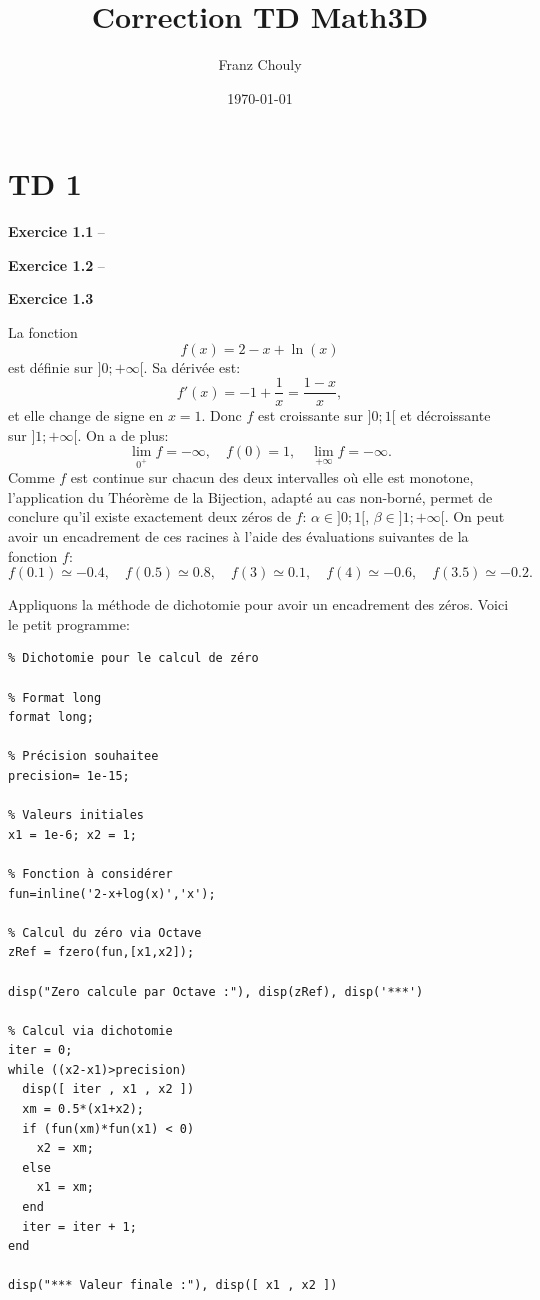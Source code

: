 \documentclass{article}
\title{Correction TD Math3D}
\author{Franz Chouly}
\date{\today}
\begin{document}
\maketitle

\section{TD 1}

{\bf Exercice 1.1} --

{\bf Exercice 1.2} --

{\bf Exercice 1.3}

La fonction
$$ f(x) = 2 - x + \ln(x) $$
est définie sur $]0;+\infty[$. Sa dérivée est:
$$ f'(x) = -1 + \frac{1}{x} = \frac{1-x}{x},$$
et elle change de signe en $x=1$. Donc $f$ est croissante sur $]0;1[$ et décroissante sur $]1;+\infty[$. On a de plus:
$$ \lim_{0^+} f = -\infty, \quad f(0) = 1, \quad \lim_{+\infty} f = -\infty.$$
Comme $f$ est continue sur chacun des deux intervalles où elle est monotone, l'application du Théorème de la Bijection, adapté au cas non-borné, permet de conclure qu'il existe exactement deux zéros de $f$: $\alpha \in ]0;1[$, $\beta \in ]1;+\infty[$.
On peut avoir un encadrement de ces racines à l'aide des évaluations suivantes de la fonction $f$:
$$
f(0.1) \simeq -0.4, \quad f(0.5) \simeq 0.8, \quad f(3) \simeq 0.1, \quad f(4) \simeq -0.6, \quad f(3.5) \simeq -0.2.
$$

\newpage

Appliquons la méthode de dichotomie pour avoir un encadrement des zéros. Voici le petit programme:
{\scriptsize
\begin{verbatim}
% Dichotomie pour le calcul de zéro

% Format long
format long;

% Précision souhaitee
precision= 1e-15;

% Valeurs initiales
x1 = 1e-6; x2 = 1;

% Fonction à considérer
fun=inline('2-x+log(x)','x');

% Calcul du zéro via Octave
zRef = fzero(fun,[x1,x2]);

disp("Zero calcule par Octave :"), disp(zRef), disp('***')

% Calcul via dichotomie
iter = 0;
while ((x2-x1)>precision)
  disp([ iter , x1 , x2 ])
  xm = 0.5*(x1+x2);
  if (fun(xm)*fun(x1) < 0)
    x2 = xm;
  else
    x1 = xm;
  end
  iter = iter + 1;
end
  
disp("*** Valeur finale :"), disp([ x1 , x2 ])
\end{verbatim}
}
\end{document}
